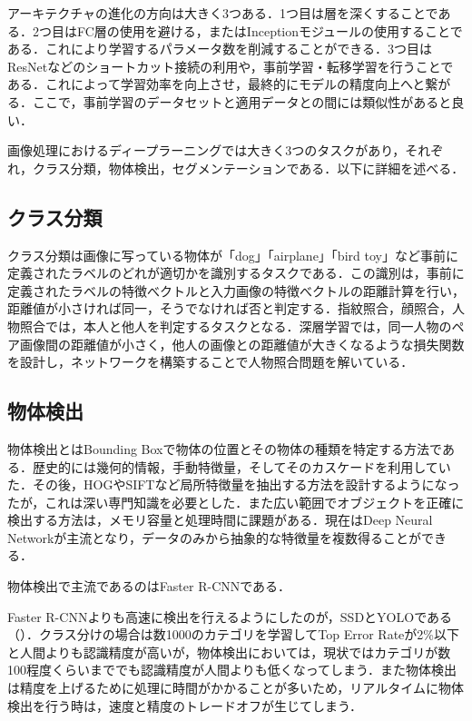 アーキテクチャの進化の方向は大きく3つある．1つ目は層を深くすることである．2つ目はFC層の使用を避ける，またはInceptionモジュールの使用することである．これにより学習するパラメータ数を削減することができる．3つ目はResNetなどのショートカット接続の利用や，事前学習・転移学習を行うことである．これによって学習効率を向上させ，最終的にモデルの精度向上へと繋がる．ここで，事前学習のデータセットと適用データとの間には類似性があると良い．

画像処理におけるディープラーニングでは大きく3つのタスクがあり，それぞれ，クラス分類，物体検出，セグメンテーションである．以下に詳細を述べる．

\subsection*{クラス分類}
クラス分類は画像に写っている物体が「dog」「airplane」「bird toy」など事前に定義されたラベルのどれが適切かを識別するタスクである．この識別は，事前に定義されたラベルの特徴べクトルと入力画像の特徴べクトルの距離計算を行い，距離値が小さければ同一，そうでなければ否と判定する．指紋照合，顔照合，人物照合では，本人と他人を判定するタスクとなる．深層学習では，同一人物のペア画像間の距離値が小さく，他人の画像との距離値が大きくなるような損失関数を設計し，ネットワークを構築することで人物照合問題を解いている．

\subsection*{物体検出}
物体検出とはBounding Boxで物体の位置とその物体の種類を特定する方法である．歴史的には幾何的情報，手動特徴量，そしてそのカスケードを利用していた．その後，HOG\cite{HOG}やSIFT\cite{SIFT}など局所特徴量を抽出する方法を設計するようになったが，これは深い専門知識を必要とした．また広い範囲でオブジェクトを正確に検出する方法は，メモリ容量と処理時間に課題がある．現在はDeep Neural Networkが主流となり，データのみから抽象的な特徴量を複数得ることができる．

物体検出で主流であるのはFaster R-CNNである\cite{faster_R-CNN}．

Faster R-CNNよりも高速に検出を行えるようにしたのが，SSD\cite{SSD}とYOLO\cite{YOLOv3}である（）．クラス分けの場合は数1000のカテゴリを学習してTop Error Rateが2\%以下と人間よりも認識精度が高いが，物体検出においては，現状ではカテゴリが数100程度くらいまででも認識精度が人間よりも低くなってしまう．また物体検出は精度を上げるために処理に時間がかかることが多いため，リアルタイムに物体検出を行う時は，速度と精度のトレードオフが生じてしまう．

